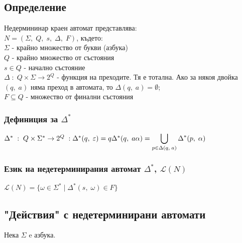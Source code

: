 \documentclass[12pt]{article}
\newcommand{\Lang}{\mathcal{L}}
\begin{document}
\subsection*{Определение}

Недермининар краен автомат представлява: \\

$N = (\Sigma, \; Q, \; s, \; \Delta, \; F)$, където: \\

$\Sigma$ - крайно множество от букви (азбука) \\

$Q$ - крайно множество от състояния \\

$s \in Q$ - начално състояние \\

$\Delta \; : \; Q \times \Sigma \to 2^Q $ - функция на преходите. Тя е тотална. Ако за някоя двойка $(q, \; a)$ няма преход в автомата, то $\Delta(q, \; a) = \emptyset$; \\

$F \subseteq Q$ - множество от финални състояния \\

\subsubsection*{Дефиниция за $\Delta^*$}

$\Delta^* \; : \; Q\times\Sigma^* \to 2^Q \; : \; \\\\
\Delta^*(q, \; \varepsilon) = {q} \\\\
\Delta^*(q, \; a\alpha) = \displaystyle\bigcup_{p \in \Delta(q, \; a)} \Delta^*(p, \; \alpha) $

\subsubsection*{Език на недетерминирания автомат $\Delta^*$, $\Lang(N)$}

$\Lang(N) = \{\omega \in \Sigma^* \; | \; \Delta^*(s, \; \omega) \in F\}$

\subsection*{"Действия" с недетерминирани автомати}

Нека $\Sigma$ e азбука. \\
\end{document}
